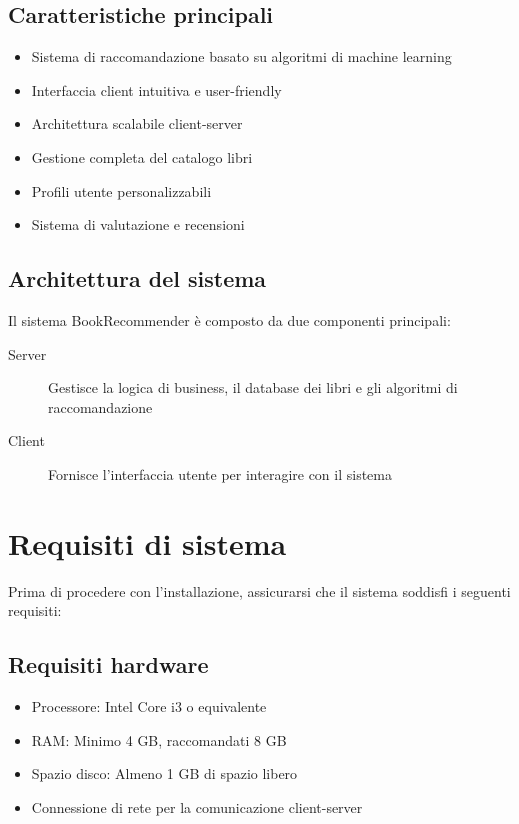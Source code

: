 \documentclass[12pt,a4paper]{article}
\begin{document}
\subsection{Caratteristiche principali}

\begin{itemize}
    \item Sistema di raccomandazione basato su algoritmi di machine learning
    \item Interfaccia client intuitiva e user-friendly
    \item Architettura scalabile client-server
    \item Gestione completa del catalogo libri
    \item Profili utente personalizzabili
    \item Sistema di valutazione e recensioni
\end{itemize}

\subsection{Architettura del sistema}

Il sistema BookRecommender è composto da due componenti principali:

\begin{description}
    \item[Server] Gestisce la logica di business, il database dei libri e gli algoritmi di raccomandazione
    \item[Client] Fornisce l'interfaccia utente per interagire con il sistema
\end{description}

\section{Requisiti di sistema}

Prima di procedere con l'installazione, assicurarsi che il sistema soddisfi i seguenti requisiti:

\subsection{Requisiti hardware}
\begin{itemize}
    \item Processore: Intel Core i3 o equivalente
    \item RAM: Minimo 4 GB, raccomandati 8 GB
    \item Spazio disco: Almeno 1 GB di spazio libero
    \item Connessione di rete per la comunicazione client-server
\end{itemize}
\end{document}
